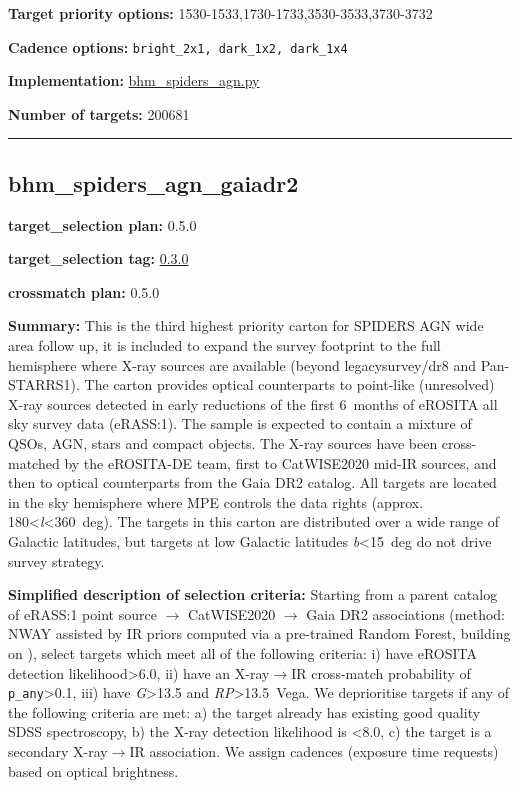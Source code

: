 \noindent\textbf{Target priority options:}
1530-1533,1730-1733,3530-3533,3730-3732

\noindent\textbf{Cadence options:} \texttt{bright\_2x1,\ dark\_1x2,\ dark\_1x4}

\noindent\textbf{Implementation:}
\href{https://github.com/sdss/target_selection/blob/0.3.0/python/target_selection/cartons/bhm_spiders_agn.py}{bhm\_spiders\_agn.py}

\noindent\textbf{Number of targets:} 200681

\begin{center}\rule{0.5\linewidth}{0.5pt}\end{center}

\hypertarget{bhm_spiders_agn_gaiadr2_plan0.5.0}{%
\subsection{bhm\_spiders\_agn\_gaiadr2}\label{bhm_spiders_agn_gaiadr2_plan0.5.0}}

\noindent\textbf{target\_selection plan:} 0.5.0

\noindent\textbf{target\_selection tag:}
\href{https://github.com/sdss/target_selection/tree/0.3.0/}{0.3.0}

\noindent\textbf{crossmatch plan:} 0.5.0

\noindent\textbf{Summary:} This is the third highest priority carton for SPIDERS
AGN wide area follow up, it is included to expand the survey footprint
to the full hemisphere where X-ray sources are available (beyond
legacysurvey/dr8 and Pan-STARRS1). The carton provides optical
counterparts to point-like (unresolved) X-ray sources detected in early
reductions of the first 6~months of eROSITA all sky survey data
(eRASS:1). The sample is expected to contain a mixture of QSOs, AGN,
stars and compact objects. The X-ray sources have been cross-matched by
the eROSITA-DE team, first to
CatWISE2020 \citep{Marocco2021}
mid-IR sources, and then to optical counterparts from the Gaia DR2
catalog. All targets are located in the sky hemisphere where MPE
controls the data rights (approx.
180\textless{}\emph{l}\textless360~deg). The targets in this carton are
distributed over a wide range of Galactic latitudes, but targets at low
Galactic latitudes \textbar{}\emph{b}\textbar\textless15~deg do not
drive survey strategy.

\noindent\textbf{Simplified description of selection criteria:} Starting from a
parent catalog of eRASS:1 point source $\rightarrow$ CatWISE2020 $\rightarrow$ Gaia DR2
associations (method: NWAY assisted by IR priors computed via a
pre-trained Random Forest, building on
\citealt{Salvato2022}), select targets which meet all of the following criteria:
i) have eROSITA detection likelihood\textgreater6.0, ii) have an
X-ray$\rightarrow$IR cross-match probability of \texttt{p\_any}\textgreater0.1, iii)
have \emph{G}\textgreater13.5 and \emph{RP}\textgreater13.5~Vega. We
deprioritise targets if any of the following criteria are met: a) the
target already has existing good quality SDSS spectroscopy, b) the X-ray
detection likelihood is \textless8.0, c) the target is a secondary
X-ray$\rightarrow$IR association. We assign cadences (exposure time requests) based
on optical brightness.


